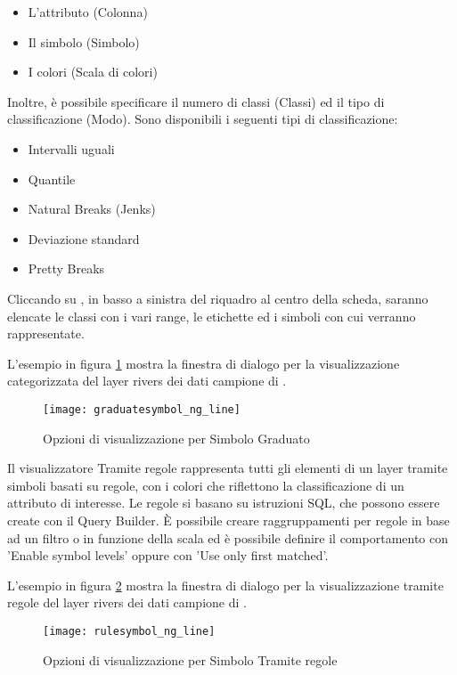 \begin{itemize}[label=--]
\item L'attributo (Colonna)
\item Il simbolo (Simbolo)
\item I colori (Scala di colori)
\end{itemize}

Inoltre, è possibile specificare il numero di classi (Classi) ed il tipo di classificazione 
(Modo). Sono disponibili i seguenti tipi di classificazione:

\begin{itemize}
 \item Intervalli uguali
 \item Quantile
 \item Natural Breaks (Jenks)
 \item Deviazione standard
 \item Pretty Breaks
\end{itemize}

Cliccando su , in basso a sinistra del riquadro al centro della scheda,
saranno elencate le classi con i vari range, le etichette ed i simboli con cui verranno 
rappresentate.

L'esempio in figura \ref{fig:gradsymNG} mostra la finestra di dialogo per la visualizzazione 
categorizzata del layer rivers dei dati campione di \qg.  

\begin{figure}[ht]
   \centering
   \texttt{[image: graduatesymbol\_ng\_line]}
   \caption{Opzioni di visualizzazione per Simbolo Graduato \wincaption}\label{fig:gradsymNG}
\end{figure}


Il visualizzatore Tramite regole rappresenta tutti gli elementi di un layer 
tramite simboli basati su regole, con i colori che riflettono la classificazione 
di un attributo di interesse. Le regole si basano su istruzioni SQL, che possono 
essere create con il Query Builder. È possibile creare raggruppamenti per regole 
in base ad un filtro o in funzione della scala ed è possibile definire il comportamento 
con 'Enable symbol levels' oppure con 'Use only first matched'.

L'esempio in figura \ref{fig:rulesymNG} mostra la finestra di dialogo per la visualizzazione 
tramite regole del layer rivers dei dati campione di \qg.

\begin{figure}[ht]
   \centering
   \texttt{[image: rulesymbol\_ng\_line]}
   \caption{Opzioni di visualizzazione per Simbolo Tramite regole \wincaption}\label{fig:rulesymNG}
\end{figure}

